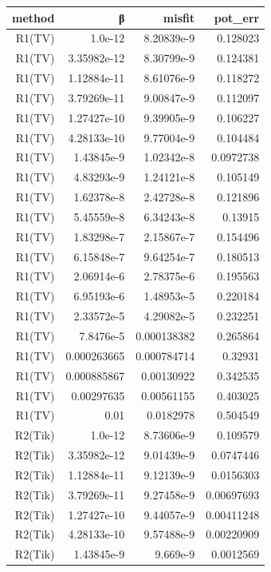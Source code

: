\begin{tabular}{rrrr}
  \toprule
  \textbf{method} & \textbf{β} & \textbf{misfit} & \textbf{pot\_err} \\
  \midrule
  R1(TV) & 1.0e-12 & 8.20839e-9 & 0.128023 \\
  R1(TV) & 3.35982e-12 & 8.30799e-9 & 0.124381 \\
  R1(TV) & 1.12884e-11 & 8.61076e-9 & 0.118272 \\
  R1(TV) & 3.79269e-11 & 9.00847e-9 & 0.112097 \\
  R1(TV) & 1.27427e-10 & 9.39905e-9 & 0.106227 \\
  R1(TV) & 4.28133e-10 & 9.77004e-9 & 0.104484 \\
  R1(TV) & 1.43845e-9 & 1.02342e-8 & 0.0972738 \\
  R1(TV) & 4.83293e-9 & 1.24121e-8 & 0.105149 \\
  R1(TV) & 1.62378e-8 & 2.42728e-8 & 0.121896 \\
  R1(TV) & 5.45559e-8 & 6.34243e-8 & 0.13915 \\
  R1(TV) & 1.83298e-7 & 2.15867e-7 & 0.154496 \\
  R1(TV) & 6.15848e-7 & 9.64254e-7 & 0.180513 \\
  R1(TV) & 2.06914e-6 & 2.78375e-6 & 0.195563 \\
  R1(TV) & 6.95193e-6 & 1.48953e-5 & 0.220184 \\
  R1(TV) & 2.33572e-5 & 4.29082e-5 & 0.232251 \\
  R1(TV) & 7.8476e-5 & 0.000138382 & 0.265864 \\
  R1(TV) & 0.000263665 & 0.000784714 & 0.32931 \\
  R1(TV) & 0.000885867 & 0.00130922 & 0.342535 \\
  R1(TV) & 0.00297635 & 0.00561155 & 0.403025 \\
  R1(TV) & 0.01 & 0.0182978 & 0.504549 \\
  R2(Tik) & 1.0e-12 & 8.73606e-9 & 0.109579 \\
  R2(Tik) & 3.35982e-12 & 9.01439e-9 & 0.0747446 \\
  R2(Tik) & 1.12884e-11 & 9.12139e-9 & 0.0156303 \\
  R2(Tik) & 3.79269e-11 & 9.27458e-9 & 0.00697693 \\
  R2(Tik) & 1.27427e-10 & 9.44057e-9 & 0.00411248 \\
  R2(Tik) & 4.28133e-10 & 9.57488e-9 & 0.00220909 \\
  R2(Tik) & 1.43845e-9 & 9.669e-9 & 0.0012569 \\

\end{tabular}
